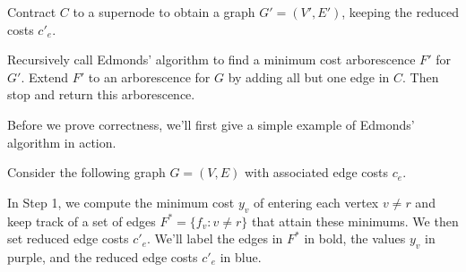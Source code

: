 \begin{mdframed}
\begin{enumerate}[leftmargin=1.75cm, label={Step \arabic*.}]
\begin{enumerate}[label={Step 2.\arabic*.}]
        Contract $C$ to a supernode to obtain a graph $G' = (V', E')$, keeping 
        the reduced costs $c'_e$. 

        Recursively call Edmonds' algorithm to find a minimum cost arborescence 
        $F'$ for $G'$. Extend $F'$ to an arborescence for $G$ by adding 
        all but one edge in $C$. Then stop and return this arborescence.
    \end{enumerate}
\end{enumerate}
\end{mdframed}\vspace{-0.15cm}
Before we prove correctness, we'll first give a simple example of Edmonds' 
algorithm in action. 

Consider the following graph $G = (V, E)$ with associated edge costs $c_e$. \vspace{-0.15cm}
\begin{center}
\end{center}
\vspace{-0.85cm}
In Step 1, we compute the minimum cost $y_v$ of entering each vertex $v \neq r$ 
and keep track of a set of edges $F^* = \{f_v : v\neq r\}$ that attain these minimums. 
We then set reduced edge costs $c'_e$. We'll label the edges in $F^*$ in bold, 
the values $y_v$ in purple, and the reduced edge costs $c'_e$ in blue. \vspace{-0.15cm}
